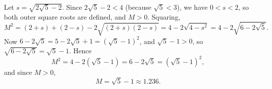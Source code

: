 Let $s=\sqrt{2\sqrt5-2}$. Since $2\sqrt5-2<4$ (because $\sqrt5<3$), we have $0<s<2$, so both outer square roots are defined, and $M>0$. Squaring,
\[M^2=(2+s)+(2-s)-2\sqrt{(2+s)(2-s)}=4-2\sqrt{4-s^2}=4-2\sqrt{6-2\sqrt5}.\]
Now $6-2\sqrt5=5-2\sqrt5+1=\left(\sqrt5-1\right)^2$, and $\sqrt5-1>0$, so $\sqrt{6-2\sqrt5}=\sqrt5-1$. Hence
\[M^2=4-2\left(\sqrt5-1\right)=6-2\sqrt5=\left(\sqrt5-1\right)^2,\]
and since $M>0$,
\[M=\boxed{\sqrt5-1}\approx1.236 .\]
